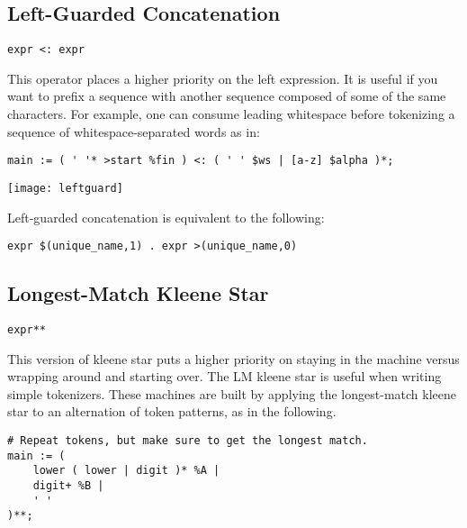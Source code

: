 \documentclass[letterpaper,11pt,oneside]{book}
\newcommand{\verbspace}{\vspace{10pt}}
\newcommand{\graphspace}{\vspace{10pt}}
\newenvironment{inline_code}{\def\baselinestretch{1}\vspace{12pt}\small}{}
\begin{document}
\subsection{Left-Guarded Concatenation}

\verb|expr <: expr| 
\verbspace

This operator places
a higher priority on the left expression. It is useful if you want to prefix a
sequence with another sequence composed of some of the same characters. For
example, one can consume leading whitespace before tokenizing a sequence of
whitespace-separated words as in:

\begin{inline_code}
\begin{verbatim}
main := ( ' '* >start %fin ) <: ( ' ' $ws | [a-z] $alpha )*;
\end{verbatim}
\end{inline_code}

\graphspace
\begin{center}
\texttt{[image: leftguard]}
\end{center}
\graphspace

Left-guarded concatenation is equivalent to the following:

\verbspace
\begin{verbatim}
expr $(unique_name,1) . expr >(unique_name,0)
\end{verbatim}
\verbspace

\subsection{Longest-Match Kleene Star}
\label{longest_match_kleene_star}

\verb|expr**| 
\verbspace

This version of kleene star puts a higher priority on staying in the
machine versus wrapping around and starting over. The LM kleene star is useful
when writing simple tokenizers.  These machines are built by applying the
longest-match kleene star to an alternation of token patterns, as in the
following.

\verbspace

% GENERATE: lmkleene
% OPT: -p
% %%{
% machine exfinpri;
% action A {}
% action B {}
\begin{inline_code}
\begin{verbatim}
# Repeat tokens, but make sure to get the longest match.
main := (
    lower ( lower | digit )* %
    digit+ %
    ' '
)**;
\end{verbatim}
\end{inline_code}
\end{document}
